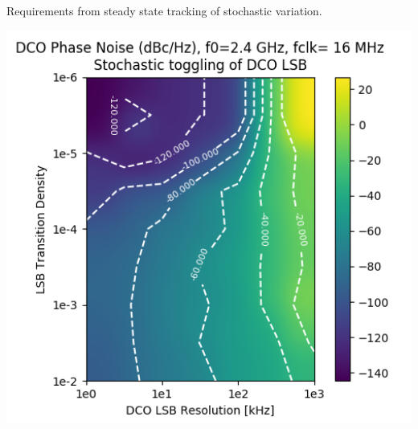 \documentclass[t, screen, aspectratio=43]{beamer}
\begin{document}
\begin{frame}
\begin{block}{Requirements from steady state tracking of stochastic variation.}
\begin{minipage}{5cm}
			\includegraphics[width=1\textwidth, angle=0]{lsb_stochastic_pn.png}
		\end{minipage}%
	\end{block}
\end{frame}
\end{document}
